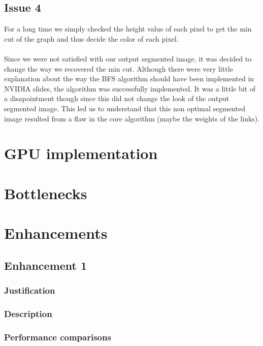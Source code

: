 \documentclass{article}
\begin{document}
\subsection{Issue 4}

For a long time we simply checked the height value of each pixel to get the min cut of the graph and thus decide the color of each pixel.\\
\\
Since we were not satisfied with our output segmented image, it was decided to change the way we recovered the min cut. Although there were very little explanation about the way the BFS algorithm should have been implemented in NVIDIA slides, the algorithm was successfully implemented. It was a little bit of a disapointment though since this did not change the look of the output segmented image. This led us to understand that this non optimal segmented image resulted from a flaw in the core algorithm (maybe the weights of the links).

\section{GPU implementation}

\section{Bottlenecks}

\section{Enhancements}

\subsection{Enhancement 1}

\subsubsection{Justification}

\subsubsection{Description}

\subsubsection{Performance comparisons}
\end{document}
